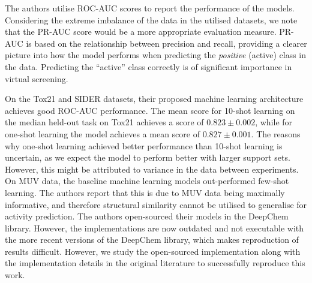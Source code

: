 The authors utilise ROC-AUC scores to report the performance of the models. Considering the extreme imbalance of the data in the utilised datasets, we note that the PR-AUC score would be a more appropriate evaluation measure. PR-AUC is based on the relationship between precision and recall, providing a clearer picture into how the model performs when predicting the \textit{positive} (active) class in the data. Predicting the ``active'' class correctly is of significant importance in virtual screening.

On the Tox21 and SIDER datasets, their proposed machine learning architecture achieves good ROC-AUC performance. The mean score for 10-shot learning on the median held-out task on Tox21 achieves a score of $0.823 \pm 0.002$, while for one-shot learning the model achieves a mean score of $0.827 \pm 0.001$. The reasons why one-shot learning achieved better performance than 10-shot learning is uncertain, as we expect the model to perform better with larger support sets. However, this might be attributed to variance in the data between experiments. On MUV data, the baseline machine learning models out-performed few-shot learning. The authors report that this is due to MUV data being maximally informative, and therefore structural similarity cannot be utilised to generalise for activity prediction. The authors open-sourced their models in the DeepChem library\citep{ramsundar2019deep}. However, the implementations are now outdated and not executable with the more recent versions of the DeepChem library, which makes reproduction of results difficult. However, we study the open-sourced implementation along with the implementation details in the original literature to successfully reproduce this work.
